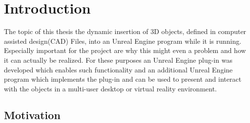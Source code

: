 \chapter{Introduction}
The topic of this thesis the dynamic insertion of 3D objects, defined in computer assisted design(CAD) Files, into an Unreal Engine program while it is running. Especially important for the project are why this might even a problem and how it can actually be realized. For these purposes an Unreal Engine plug-in was developed which enables such functionality and an additional Unreal Engine program which implements the plug-in and can be used to present and interact with the objects in a multi-user desktop or virtual reality environment.

\section{Motivation}

